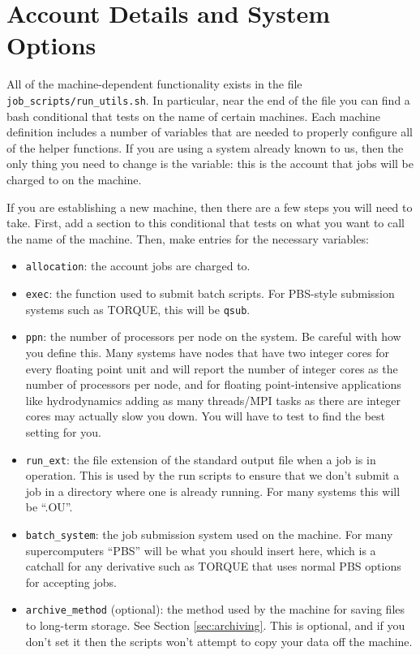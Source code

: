 \documentclass[12pt]{book}
\begin{document}
\section{Account Details and System Options}

All of the machine-dependent functionality exists in the file \texttt{job\_scripts/run\_utils.sh}.
In particular, near the end of the file you can find a bash conditional that tests on the name of 
certain machines. Each machine definition includes a number of variables that are needed to 
properly configure all of the helper functions. If you are using a system already known to us,
then the only thing you need to change is the  variable: this is the account 
that jobs will be charged to on the machine. 

If you are establishing a new machine, then there are a few steps you will need to take. First, 
add a section to this conditional that tests on what you want to call the name of the machine. 
Then, make entries for the necessary variables:
\begin{itemize}
  \item \texttt{allocation}: the account jobs are charged to.
  \item \texttt{exec}: the function used to submit batch scripts. For PBS-style submission 
systems such as TORQUE, this will be \texttt{qsub}.
  \item \texttt{ppn}: the number of processors per node on the system. Be careful with how 
you define this. Many systems have nodes that have two integer cores for every floating point
unit and will report the number of integer cores as the number of processors per node, 
and for floating point-intensive applications like hydrodynamics adding as many threads/MPI tasks
as there are integer cores may actually slow you down. You will have to test to find 
the best setting for you.
  \item \texttt{run\_ext}: the file extension of the standard output file when a job is in operation. 
This is used by the run scripts to ensure that we don't submit a job in a directory where one is 
already running. For many systems this will be ``.OU''.
  \item \texttt{batch\_system}: the job submission system used on the machine. For many supercomputers 
``PBS'' will be what you should insert here, which is a catchall for any derivative such as TORQUE 
that uses normal PBS options for accepting jobs.
  \item \texttt{archive\_method} (optional): the method used by the machine for saving files to 
long-term storage. See Section \ref{sec:archiving}. This is optional, and if you don't set it then
the scripts won't attempt to copy your data off the machine.
\end{itemize}
\end{document}
